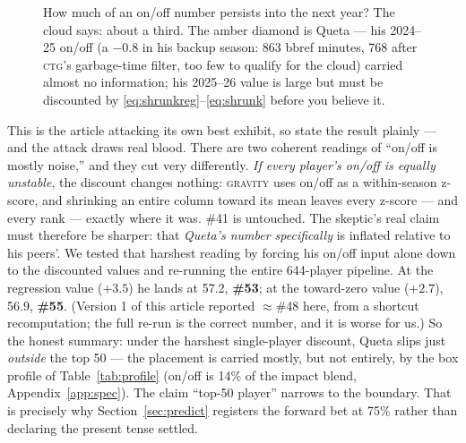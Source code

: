 \documentclass[11pt]{article}
\newcommand{\gravity}{\textsc{gravity}}
\newcommand{\ctg}{\textsc{ctg}}
\begin{document}
\begin{figure}[h]
\centering
{}
\caption{How much of an on/off number persists into the next year? The cloud says:
about a third. The amber diamond is Queta --- his 2024--25 on/off (a $-0.8$ in his
backup season: 863 bbref minutes, 768 after \ctg{}'s garbage-time filter, too few to
qualify for the cloud) carried almost no information; his 2025--26 value is large but
must be discounted by \eqref{eq:shrunkreg}--\eqref{eq:shrunk} before you believe it.}
\label{fig:onoff}
\end{figure}

This is the article attacking its own best exhibit, so state the result plainly --- and
the attack draws real blood. There are two coherent readings of ``on/off is mostly
noise,'' and they cut very differently. \emph{If every player's on/off is equally
unstable}, the discount changes nothing: \gravity{} uses on/off as a within-season
z-score, and shrinking an entire column toward its mean leaves every z-score --- and
every rank --- exactly where it was. \#41 is untouched. The skeptic's real claim must
therefore be sharper: that \emph{Queta's number specifically} is inflated relative to
his peers'. We tested that harshest reading by forcing his on/off input alone down to
the discounted values and re-running the entire 644-player pipeline. At the
regression value ($+3.5$) he lands at 57.2, \textbf{\#53}; at the toward-zero value
($+2.7$), 56.9, \textbf{\#55}. (Version 1 of this article reported $\approx$\#48 here,
from a shortcut recomputation; the full re-run is the correct number, and it is worse
for us.) So the honest summary: under the harshest single-player discount, Queta slips
just \emph{outside} the top 50 --- the placement is carried mostly, but not entirely,
by the box profile of Table~\ref{tab:profile} (on/off is 14\% of the impact blend,
Appendix~\ref{app:spec}). The claim ``top-50 player'' narrows to the boundary. That is
precisely why Section~\ref{sec:predict} registers the forward bet at 75\% rather than
declaring the present tense settled.
\end{document}
